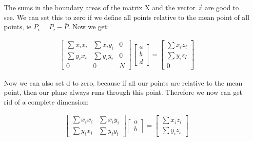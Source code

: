 \documentclass[11pt,oneside,openright]{mpreport}
\begin{document}
The sums in the boundary areas of the matrix X and the vector $\vec{z}$ are good to see. We can set this to zero if we define all points relative to the mean point of all points,
ie $P_i = P_i - \overline{P}$. Now we get:

\begin{align*}
\begin{bmatrix}
\sum x_i x_i & \sum x_i y_i & 0 \\
\sum y_i x_i & \sum y_i y_i & 0 \\
0 & 0 & N
\end{bmatrix} 
\begin{bmatrix}
a \\
b \\
d 
\end{bmatrix} 
 = 
\begin{bmatrix}
\sum x_i z_i \\
\sum y_i z_I \\
0 
\end{bmatrix} 
\end{align*}

Now we can also set d to zero, because if all our points are relative to the mean point, then our plane always runs through this point. Therefore we now can get rid of a complete dimension:

\begin{align*}
\begin{bmatrix}
\sum x_i x_i & \sum x_i y_i \\
\sum y_i x_i & \sum y_i y_i
\end{bmatrix} 
\begin{bmatrix}
a \\
b 
\end{bmatrix} 
 = 
\begin{bmatrix}
\sum x_i z_i \\
\sum y_i z_i
\end{bmatrix} 
\end{align*}
\end{document}
